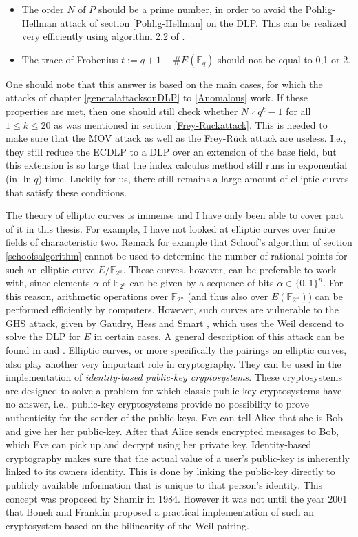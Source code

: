 \documentclass{article}
\numberwithin{equation}{section}
\theoremstyle{definition}
\newcommand{\FF}[1]{{\mathbb F}_{#1}} %
\begin{document}
\begin{itemize}
\item The order $N$ of $P$ should be a prime number, in order to avoid the Pohlig-Hellman attack of section \ref{Pohlig-Hellman} on the DLP. This can be realized very efficiently using algorithm 2.2 of \cite{constrprimeordEC}.
\item The trace of Frobenius $t:=q+1-\#E(\FF{q})$ should not be equal to 0,1 or 2.  
\end{itemize} 
One should note that this answer is based on the main cases, for which the attacks of chapter \ref{generalattacksonDLP} to \ref{Anomalous} work. If these properties are met, then one should still check whether $N \nmid q^k-1$ for all $1\leq k \leq 20$ as was mentioned in section \ref{Frey-Ruckattack}. This is needed to make sure that the MOV attack as well as the Frey-R\"uck attack are useless. I.e., they still reduce the ECDLP to a DLP over an extension of the base field, but this extension is so large that the index calculus method still runs in exponential (in $\ln q$) time. Luckily for us, there still remains a large amount of elliptic curves that satisfy these conditions.\par 
The theory of elliptic curves is immense and I have only been able to cover part of it in this thesis. For example, I have not looked at elliptic curves over finite fields of characteristic two. Remark for example that Schoof's algorithm of section \ref{schoofsalgorithm} cannot be used to determine the number of rational points for such an elliptic curve $E/\FF{2^n}$. These curves, however, can be preferable to work with, since elements $\alpha$ of $\FF{2^n}$ can be given by a sequence of bits $\alpha \in \{0,1\}^n$. For this reason, arithmetic operations over $\FF{2^n}$ (and thus also over $E(\FF{2^n})$) can be performed efficiently by computers. However, such curves are vulnerable to the GHS attack, given by Gaudry, Hess and Smart , which uses the Weil descend to solve the DLP for $E$ in certain cases. A general description of this attack can be found in \cite{GHSarticle2} and \cite{GHSarticle1}.\newpage
Elliptic curves, or more specifically the pairings on elliptic curves, also play another very important role in cryptography. They can be used in the implementation of \emph{identity-based public-key cryptosystems}. These cryptosystems are designed to solve a problem for which classic public-key cryptosystems have no answer, i.e., public-key cryptosystems provide no possibility to prove authenticity for the sender of the public-keys. Eve can tell Alice that she is Bob and give her her public-key. After that Alice sends encrypted messages to Bob, which Eve can pick up and decrypt using her private key. Identity-based cryptography makes sure that the actual value of a user's public-key is inherently linked to its owners identity. This is done by linking the public-key directly to publicly available information that is unique to that person's identity. This concept was proposed by Shamir \cite{Shamir} in 1984. However it was not until the year 2001 that Boneh and Franklin \cite{idcryptography} proposed a practical implementation of such an cryptosystem based on the bilinearity of the Weil pairing. \par 
\end{document}
